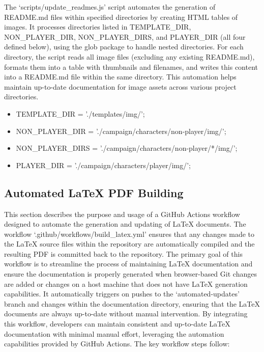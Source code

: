 The `scripts/update\_readmes.js' script automates the generation of README.md files within specified directories by creating HTML tables of images. It processes directories listed in TEMPLATE\_DIR, NON\_PLAYER\_DIR, NON\_PLAYER\_DIRS, and PLAYER\_DIR (all four defined below), using the glob package to handle nested directories. For each directory, the script reads all image files (excluding any existing README.md), formats them into a table with thumbnails and filenames, and writes this content into a README.md file within the same directory. This automation helps maintain up-to-date documentation for image assets across various project directories.

\begin{itemize}
\item TEMPLATE\_DIR = './templates/img/';
\item NON\_PLAYER\_DIR = './campaign/characters/non-player/img/';
\item NON\_PLAYER\_DIRS = './campaign/characters/non-player/*/img/';
\item PLAYER\_DIR = './campaign/characters/player/img/';
\end{itemize}








\subsection{Automated LaTeX PDF Building}


This section describes the purpose and usage of a GitHub Actions workflow designed to automate the generation and updating of LaTeX documents. The workflow `.github/workflows/build\_latex.yml' ensures that any changes made to the LaTeX source files within the repository are automatically compiled and the resulting PDF is committed back to the repository. The primary goal of this workflow is to streamline the process of maintaining LaTeX documentation and ensure the documentation is properly generated when browser-based Git changes are added or changes on a host machine that does not have LaTeX generation capabilities. It automatically triggers on pushes to the `automated-updates' branch and changes within the documentation directory, ensuring that the LaTeX documents are always up-to-date without manual intervention. By integrating this workflow, developers can maintain consistent and up-to-date LaTeX documentation with minimal manual effort, leveraging the automation capabilities provided by GitHub Actions. The key workflow steps follow:

